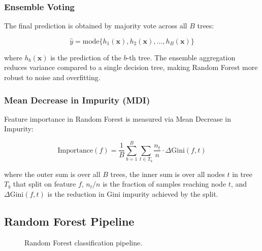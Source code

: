 \documentclass[12pt,a4paper]{article}
\begin{document}
\subsubsection{Ensemble Voting}

The final prediction is obtained by majority vote across all $B$ trees:

\begin{equation}
\hat{y} = \text{mode}\{h_1(\mathbf{x}), h_2(\mathbf{x}), \ldots, h_B(\mathbf{x})\}
\label{eq:rf_vote}
\end{equation}

where $h_b(\mathbf{x})$ is the prediction of the $b$-th tree. The ensemble aggregation reduces variance compared to a single decision tree, making Random Forest more robust to noise and overfitting.

\subsubsection{Mean Decrease in Impurity (MDI)}

Feature importance in Random Forest is measured via Mean Decrease in Impurity:

\begin{equation}
\text{Importance}(f) = \frac{1}{B}\sum_{b=1}^{B}\sum_{t \in T_b} \frac{n_t}{n} \cdot \Delta\text{Gini}(f, t)
\label{eq:mdi}
\end{equation}

where the outer sum is over all $B$ trees, the inner sum is over all nodes $t$ in tree $T_b$ that split on feature $f$, $n_t/n$ is the fraction of samples reaching node $t$, and $\Delta\text{Gini}(f,t)$ is the reduction in Gini impurity achieved by the split.

\subsection{Random Forest Pipeline}

\begin{figure}[H]
\centering
{}
\caption{Random Forest classification pipeline.}
\label{fig:rf_pipeline}
\end{figure}
\end{document}

